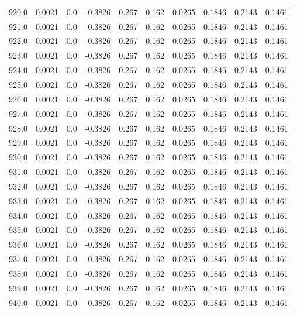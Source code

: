 \begin{longtable}{lrrrrrrrrr}
920.0 & 0.0021 & 0.0 & -0.3826 & 0.267 & 0.162 & 0.0265 & 0.1846 & 0.2143 & 0.1461 \\
921.0 & 0.0021 & 0.0 & -0.3826 & 0.267 & 0.162 & 0.0265 & 0.1846 & 0.2143 & 0.1461 \\
922.0 & 0.0021 & 0.0 & -0.3826 & 0.267 & 0.162 & 0.0265 & 0.1846 & 0.2143 & 0.1461 \\
923.0 & 0.0021 & 0.0 & -0.3826 & 0.267 & 0.162 & 0.0265 & 0.1846 & 0.2143 & 0.1461 \\
924.0 & 0.0021 & 0.0 & -0.3826 & 0.267 & 0.162 & 0.0265 & 0.1846 & 0.2143 & 0.1461 \\
925.0 & 0.0021 & 0.0 & -0.3826 & 0.267 & 0.162 & 0.0265 & 0.1846 & 0.2143 & 0.1461 \\
926.0 & 0.0021 & 0.0 & -0.3826 & 0.267 & 0.162 & 0.0265 & 0.1846 & 0.2143 & 0.1461 \\
927.0 & 0.0021 & 0.0 & -0.3826 & 0.267 & 0.162 & 0.0265 & 0.1846 & 0.2143 & 0.1461 \\
928.0 & 0.0021 & 0.0 & -0.3826 & 0.267 & 0.162 & 0.0265 & 0.1846 & 0.2143 & 0.1461 \\
929.0 & 0.0021 & 0.0 & -0.3826 & 0.267 & 0.162 & 0.0265 & 0.1846 & 0.2143 & 0.1461 \\
930.0 & 0.0021 & 0.0 & -0.3826 & 0.267 & 0.162 & 0.0265 & 0.1846 & 0.2143 & 0.1461 \\
931.0 & 0.0021 & 0.0 & -0.3826 & 0.267 & 0.162 & 0.0265 & 0.1846 & 0.2143 & 0.1461 \\
932.0 & 0.0021 & 0.0 & -0.3826 & 0.267 & 0.162 & 0.0265 & 0.1846 & 0.2143 & 0.1461 \\
933.0 & 0.0021 & 0.0 & -0.3826 & 0.267 & 0.162 & 0.0265 & 0.1846 & 0.2143 & 0.1461 \\
934.0 & 0.0021 & 0.0 & -0.3826 & 0.267 & 0.162 & 0.0265 & 0.1846 & 0.2143 & 0.1461 \\
935.0 & 0.0021 & 0.0 & -0.3826 & 0.267 & 0.162 & 0.0265 & 0.1846 & 0.2143 & 0.1461 \\
936.0 & 0.0021 & 0.0 & -0.3826 & 0.267 & 0.162 & 0.0265 & 0.1846 & 0.2143 & 0.1461 \\
937.0 & 0.0021 & 0.0 & -0.3826 & 0.267 & 0.162 & 0.0265 & 0.1846 & 0.2143 & 0.1461 \\
938.0 & 0.0021 & 0.0 & -0.3826 & 0.267 & 0.162 & 0.0265 & 0.1846 & 0.2143 & 0.1461 \\
939.0 & 0.0021 & 0.0 & -0.3826 & 0.267 & 0.162 & 0.0265 & 0.1846 & 0.2143 & 0.1461 \\
940.0 & 0.0021 & 0.0 & -0.3826 & 0.267 & 0.162 & 0.0265 & 0.1846 & 0.2143 & 0.1461 \\

\end{longtable}

